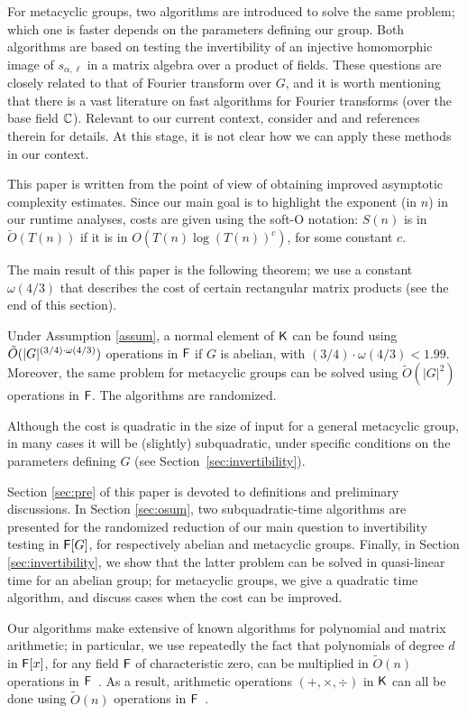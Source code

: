 For metacyclic groups, two algorithms are introduced to solve the same
problem; which one is faster depends on the parameters defining our
group. Both algorithms are based on testing the invertibility of an
injective homomorphic image of $s_{\alpha,\ell}$ in a matrix algebra
over a product of fields. These questions are closely related to that
of Fourier transform over $G$, and it is worth mentioning that there
is a vast literature on fast algorithms for Fourier transforms (over
the base field $\mathbb{C}$). Relevant to our current context, consider
\citep{ClaMu04} and \citep{MaRockWol18} and references therein
for details. At this stage, it is not clear how we can apply these
methods in our context.

This paper is written from the point of view of obtaining improved
asymptotic complexity estimates. Since our main goal is to highlight
the exponent (in $n$) in our runtime analyses, costs are given using
the soft-O notation: $S(n)$ is in $\tilde{O}(T(n))$ if it is in
$O(T(n) \log(T(n))^c)$, for some constant $c$.

The main result of this paper is the following theorem; we use a
constant $\omega(4/3)$ that describes the cost of certain rectangular
matrix products (see the end of this section).
\begin{theorem}\label{thm:main}
  Under Assumption \ref{assum}, a normal element of ${\mathsf{K}}$ can be found
  using $\tilde{O}(\vert G \vert ^{(3/4)\cdot \omega(4/3)})$ operations in ${\mathsf{F}}$ if $G$ is abelian, with
  $(3/4)\cdot\omega(4/3)<1.99$.  Moreover, the same problem for
  metacyclic groups can be solved using $\tilde{O}(\vert G \vert^2)$
  operations in ${\mathsf{F}}$. The algorithms are randomized.
\end{theorem}
Although the cost is quadratic in the size of input for a general
metacyclic group, in many cases it will be (slightly) subquadratic,
under specific conditions on the parameters defining $G$ (see
Section~\ref{sec:invertibility}).

Section \ref{sec:pre} of this paper is devoted to definitions and
preliminary discussions.  In Section \ref{sec:osum}, two
subquadratic-time algorithms are presented for the randomized reduction
of our main question to invertibility testing in ${\mathsf{F}}[G]$, for
respectively abelian and metacyclic groups.  Finally, in Section
\ref{sec:invertibility}, we show that the latter problem can be solved
in quasi-linear time for an abelian group; for metacyclic
groups, we give a quadratic time algorithm, and discuss cases when
the cost can be improved.

Our algorithms make
extensive of known algorithms for polynomial and matrix arithmetic; in
particular, we use repeatedly the fact that polynomials of degree $d$ in
${\mathsf{F}}[x]$, for any field ${\mathsf{F}}$ of characteristic zero, can be multiplied in
$\tilde{O}(n)$ operations in ${\mathsf{F}}$~\citep{ScSt71}. As a result, arithmetic 
operations $(+,\times,\div)$ in ${\mathsf{K}}$ can all be done using $\tilde{O}(n)$ 
operations in ${\mathsf{F}}$~\citep{vzGathen13}.

